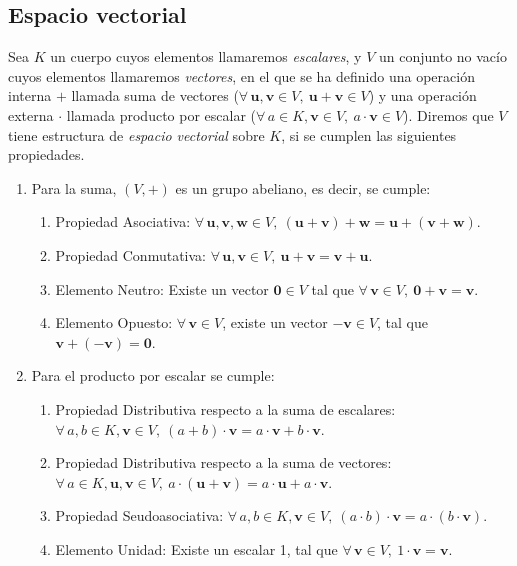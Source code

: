 \documentclass[a4paper]{article}
\begin{document}
\subsection*{Espacio vectorial}
Sea $K$ un cuerpo cuyos elementos llamaremos \emph{escalares}, y $V$ un
conjunto no vacío cuyos elementos llamaremos \emph{vectores}, en el que se ha
definido una operación interna $+$ llamada suma de vectores ($\forall\,
\mathbf{u},\mathbf{v}\in V,\ \mathbf{u}+\mathbf{v}\in V$) y una operación
externa $\cdot$ llamada producto por escalar ($\forall\, a\in K, \mathbf{v}\in
V,\ a\cdot \mathbf{v}\in V$). Diremos que $V$ tiene estructura de \emph{espacio
vectorial} sobre $K$, si se cumplen las siguientes propiedades.
\begin{enumerate}
\item Para la suma, $(V,+)$ es un grupo abeliano, es decir, se cumple:
\begin{enumerate}
\item Propiedad Asociativa: $\forall\, \mathbf{u},\mathbf{v},\mathbf{w}\in V,\
 (\mathbf{u}+\mathbf{v})+\mathbf{w}=\mathbf{u}+(\mathbf{v}+\mathbf{w})$.
\item Propiedad Conmutativa: $\forall\, \mathbf{u},\mathbf{v}\in V,\
\mathbf{u}+\mathbf{v}=\mathbf{v}+\mathbf{u}$.
\item Elemento Neutro: Existe un vector $\mathbf{0}\in V$ tal que $\forall\, \mathbf{v}\in V,\
\mathbf{0}+\mathbf{v}=\mathbf{v}$.
\item Elemento Opuesto: $\forall\, \mathbf{v}\in V$, existe un vector $\mathbf{-v}\in V$, tal que
$\mathbf{v}+(\mathbf{-v})=\mathbf{0}$.
\end{enumerate}
\item Para el producto por escalar se cumple:
\begin{enumerate}
\item Propiedad Distributiva respecto a la suma de escalares: $\forall\,
a,b\in K,\mathbf{v}\in V,\ (a+b)\cdot \mathbf{v}=a\cdot \mathbf{v}+b\cdot
\mathbf{v}$.
\item Propiedad Distributiva respecto a la suma de vectores:$\forall\,
a\in K,\mathbf{u},\mathbf{v}\in V,\ a\cdot (\mathbf{u}+\mathbf{v})=a\cdot
\mathbf{u}+a\cdot \mathbf{v}$.
\item Propiedad Seudoasociativa: $\forall\,
a,b\in K,\mathbf{v}\in V,\ (a\cdot b)\cdot \mathbf{v}=a\cdot (b\cdot
\mathbf{v})$.
\item Elemento Unidad: Existe un escalar 1, tal que $\forall\, \mathbf{v}\in V,\ 1\cdot
\mathbf{v}=\mathbf{v}$.
\end{enumerate}
\end{enumerate}
\end{document}

